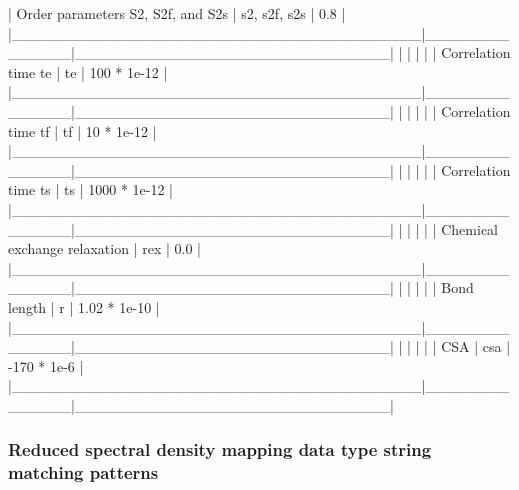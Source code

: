 | Order parameters S2, S2f, and S2s     | s2, s2f, s2s | 0.8                          |
|\_\_\_\_\_\_\_\_\_\_\_\_\_\_\_\_\_\_\_\_\_\_\_\_\_\_\_\_\_\_\_\_\_\_\_\_\_\_\_|\_\_\_\_\_\_\_\_\_\_\_\_\_\_|\_\_\_\_\_\_\_\_\_\_\_\_\_\_\_\_\_\_\_\_\_\_\_\_\_\_\_\_\_\_|
|                                       |              |                              |
| Correlation time te                   | te           | 100 * 1e-12                  |
|\_\_\_\_\_\_\_\_\_\_\_\_\_\_\_\_\_\_\_\_\_\_\_\_\_\_\_\_\_\_\_\_\_\_\_\_\_\_\_|\_\_\_\_\_\_\_\_\_\_\_\_\_\_|\_\_\_\_\_\_\_\_\_\_\_\_\_\_\_\_\_\_\_\_\_\_\_\_\_\_\_\_\_\_|
|                                       |              |                              |
| Correlation time tf                   | tf           | 10 * 1e-12                   |
|\_\_\_\_\_\_\_\_\_\_\_\_\_\_\_\_\_\_\_\_\_\_\_\_\_\_\_\_\_\_\_\_\_\_\_\_\_\_\_|\_\_\_\_\_\_\_\_\_\_\_\_\_\_|\_\_\_\_\_\_\_\_\_\_\_\_\_\_\_\_\_\_\_\_\_\_\_\_\_\_\_\_\_\_|
|                                       |              |                              |
| Correlation time ts                   | ts           | 1000 * 1e-12                 |
|\_\_\_\_\_\_\_\_\_\_\_\_\_\_\_\_\_\_\_\_\_\_\_\_\_\_\_\_\_\_\_\_\_\_\_\_\_\_\_|\_\_\_\_\_\_\_\_\_\_\_\_\_\_|\_\_\_\_\_\_\_\_\_\_\_\_\_\_\_\_\_\_\_\_\_\_\_\_\_\_\_\_\_\_|
|                                       |              |                              |
| Chemical exchange relaxation          | rex          | 0.0                          |
|\_\_\_\_\_\_\_\_\_\_\_\_\_\_\_\_\_\_\_\_\_\_\_\_\_\_\_\_\_\_\_\_\_\_\_\_\_\_\_|\_\_\_\_\_\_\_\_\_\_\_\_\_\_|\_\_\_\_\_\_\_\_\_\_\_\_\_\_\_\_\_\_\_\_\_\_\_\_\_\_\_\_\_\_|
|                                       |              |                              |
| Bond length                           | r            | 1.02 * 1e-10                 |
|\_\_\_\_\_\_\_\_\_\_\_\_\_\_\_\_\_\_\_\_\_\_\_\_\_\_\_\_\_\_\_\_\_\_\_\_\_\_\_|\_\_\_\_\_\_\_\_\_\_\_\_\_\_|\_\_\_\_\_\_\_\_\_\_\_\_\_\_\_\_\_\_\_\_\_\_\_\_\_\_\_\_\_\_|
|                                       |              |                              |
| CSA                                   | csa          | -170 * 1e-6                  |
|\_\_\_\_\_\_\_\_\_\_\_\_\_\_\_\_\_\_\_\_\_\_\_\_\_\_\_\_\_\_\_\_\_\_\_\_\_\_\_|\_\_\_\_\_\_\_\_\_\_\_\_\_\_|\_\_\_\_\_\_\_\_\_\_\_\_\_\_\_\_\_\_\_\_\_\_\_\_\_\_\_\_\_\_|




\subsubsection{Reduced spectral density mapping data type string matching patterns}



